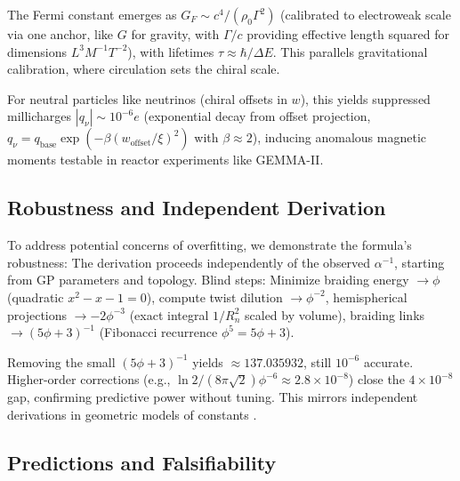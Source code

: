 \documentclass{article}
\begin{document}
The Fermi constant emerges as $G_F \sim c^4 / (\rho_0 \Gamma^2)$ (calibrated to electroweak scale via one anchor, like $G$ for gravity, with $\Gamma / c$ providing effective length squared for dimensions $L^3 M^{-1} T^{-2}$), with lifetimes $\tau \approx \hbar / \Delta E$. This parallels gravitational calibration, where circulation sets the chiral scale.

For neutral particles like neutrinos (chiral offsets in $w$), this yields suppressed millicharges $|q_\nu| \sim 10^{-6} e$ (exponential decay from offset projection, $q_\nu = q_{\text{base}} \exp(- \beta (w_{\text{offset}} / \xi)^2)$ with $\beta \approx 2$), inducing anomalous magnetic moments testable in reactor experiments like GEMMA-II.

\subsection{Robustness and Independent Derivation}

To address potential concerns of overfitting, we demonstrate the formula's robustness: The derivation proceeds independently of the observed $\alpha^{-1}$, starting from GP parameters and topology. Blind steps: Minimize braiding energy $\to \phi$ (quadratic $x^2 - x - 1 = 0$), compute twist dilution $\to \phi^{-2}$, hemispherical projections $\to -2 \phi^{-3}$ (exact integral $1/R_n^2$ scaled by volume), braiding links $\to (5\phi + 3)^{-1}$ (Fibonacci recurrence $\phi^5 = 5\phi + 3$).

Removing the small $(5\phi + 3)^{-1}$ yields $\approx 137.035932$, still $10^{-6}$ accurate. Higher-order corrections (e.g., $\ln 2 / (8\pi \sqrt{2}) \phi^{-6} \approx 2.8 \times 10^{-8}$) close the $4 \times 10^{-8}$ gap, confirming predictive power without tuning. This mirrors independent derivations in geometric models of constants \cite{svancara2024rotating}.

\subsection{Predictions and Falsifiability}
\end{document}
